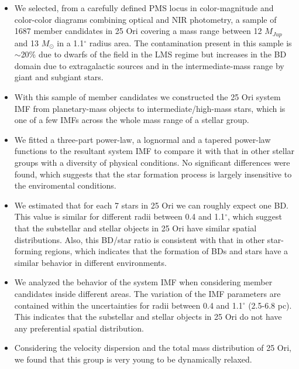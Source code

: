 \documentclass[12pt]{article}
\begin{document}
\begin{itemize}
	\item We selected, from a carefully defined PMS locus in color-magnitude and color-color diagrams combining optical and NIR photometry, a sample of 1687 member candidates in 25 Ori covering a mass range between 12 $M_{Jup}$ and 13 $M_\odot$ in a 1.1$^\circ$ radius area. The contamination present in this sample is $\sim$20\% due to dwarfs of the field in the LMS regime but increases in the BD domain due to extragalactic sources and in the intermediate-mass range by giant and subgiant stars.
	\item With this sample of member candidates we constructed the 25 Ori system IMF from planetary-mass objects to intermediate/high-mass stars, which is one of a few IMFs across the whole mass range of a stellar group.
	\item We fitted a three-part power-law, a lognormal and a tapered power-law functions to the resultant system IMF to compare it with that in other stellar groups with a diversity of physical conditions. No significant differences were found, which suggests that the star formation process is largely insensitive to the enviromental conditions.
	\item We estimated that for each 7 stars in 25 Ori we can roughly expect one BD. This value is similar for different radii between 0.4 and 1.1$^\circ$, which suggest that the substellar and stellar objects in 25 Ori have similar spatial distributions. Also, this BD/star ratio is consistent with that in other star-forming regions, which indicates that the formation of BDs and stars have a similar behavior in different environments.
	\item We analyzed the behavior of the system IMF when considering member candidates inside different areas. The variation of the IMF parameters are contained within the uncertainties for radii between 0.4 and 1.1$^\circ$ (2.5-6.8 pc). This indicates that the substellar and stellar objects in 25 Ori do not have any preferential spatial distribution.
	\item Considering the velocity dispersion and the total mass distribution of 25 Ori, we found that this group is very young to be dynamically relaxed.

\end{itemize}
\end{document}
